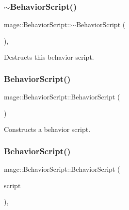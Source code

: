 \subsubsection{\texorpdfstring{$\sim$\+Behavior\+Script()}{~BehaviorScript()}}
{\footnotesize\ttfamily mage\+::\+Behavior\+Script\+::$\sim$\+Behavior\+Script (\begin{DoxyParamCaption}{ }\end{DoxyParamCaption})\hspace{0.3cm}{\ttfamily [virtual]}, {\ttfamily [default]}}

Destructs this behavior script. \hypertarget{classmage_1_1_behavior_script_ad064a6bbe2ba5f7622d1d20eeec958bf}{}\label{classmage_1_1_behavior_script_ad064a6bbe2ba5f7622d1d20eeec958bf} 
\subsubsection{\texorpdfstring{Behavior\+Script()}{BehaviorScript()}\hspace{0.1cm}{\footnotesize\ttfamily [1/3]}}
{\footnotesize\ttfamily mage\+::\+Behavior\+Script\+::\+Behavior\+Script (\begin{DoxyParamCaption}{ }\end{DoxyParamCaption})\hspace{0.3cm}{\ttfamily [protected]}}

Constructs a behavior script. \hypertarget{classmage_1_1_behavior_script_ab95b988867dfb8592ab7678bff608116}{}\label{classmage_1_1_behavior_script_ab95b988867dfb8592ab7678bff608116} 
\subsubsection{\texorpdfstring{Behavior\+Script()}{BehaviorScript()}\hspace{0.1cm}{\footnotesize\ttfamily [2/3]}}
{\footnotesize\ttfamily mage\+::\+Behavior\+Script\+::\+Behavior\+Script (\begin{DoxyParamCaption}\item[{const \hyperlink{classmage_1_1_behavior_script}{Behavior\+Script} \&}]{script }\end{DoxyParamCaption})\hspace{0.3cm}{\ttfamily [protected]}, {\ttfamily [default]}}

